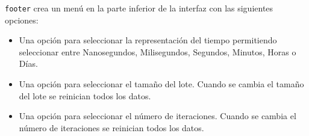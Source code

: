 \texttt{footer} crea un menú en la parte inferior de la interfaz con las siguientes opciones:

\begin{itemize}
    \item Una opción para seleccionar la representación del tiempo permitiendo seleccionar entre Nanosegundos, Milisegundos, Segundos, Minutos, Horas o Días.
    \item Una opción para seleccionar el tamaño del lote. Cuando se cambia el tamaño del lote se reinician todos los datos.
    \item Una opción para seleccionar el número de iteraciones. Cuando se cambia el número de iteraciones se reinician todos los datos.
\end{itemize}\bigskip

